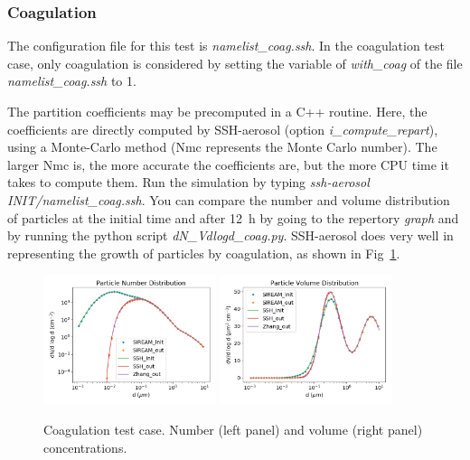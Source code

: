 \documentclass[a4paper,11pt]{article}
\begin{document}
\subsubsection{Coagulation}
\label{coag-test}

The configuration file for this test is {\it{namelist\_coag.ssh}}.
In the coagulation test case, only coagulation is considered by setting the variable of {\it{with\_coag}} of the file {\it{namelist\_coag.ssh}} to 1.

The partition coefficients may be precomputed in a C++ routine. Here, the
coefficients are directly computed by SSH-aerosol (option {\it{i\_compute\_repart}}), using a
Monte-Carlo method (Nmc represents the Monte Carlo number). The larger Nmc is,
the more accurate the coefficients are, but the more CPU time it takes to
compute them.
Run the simulation by typing {\it{ssh-aerosol INIT/namelist\_coag.ssh}}.
You can compare the number and volume distribution of particles at the initial
time and after 12~h by going to the repertory {\it{graph}} and by running the
python script {\it{dN\_Vdlogd\_coag.py}}.
SSH-aerosol does very well in representing the growth of particles by
coagulation, as shown in Fig~\ref{fig-coag}.

\begin{figure}[H]
        \begin{center}
                \includegraphics[angle=0,width=0.45\textwidth]{../graph/figure_ref/dNdlogd_COAG.png}
                \includegraphics[angle=0,width=0.45\textwidth]{../graph/figure_ref/dVdlogd_COAG.png}
        \end{center}
\caption{Coagulation test case. Number (left panel) and volume (right panel) concentrations.}
\label{fig-coag}
\end{figure}
        
\end{document}
